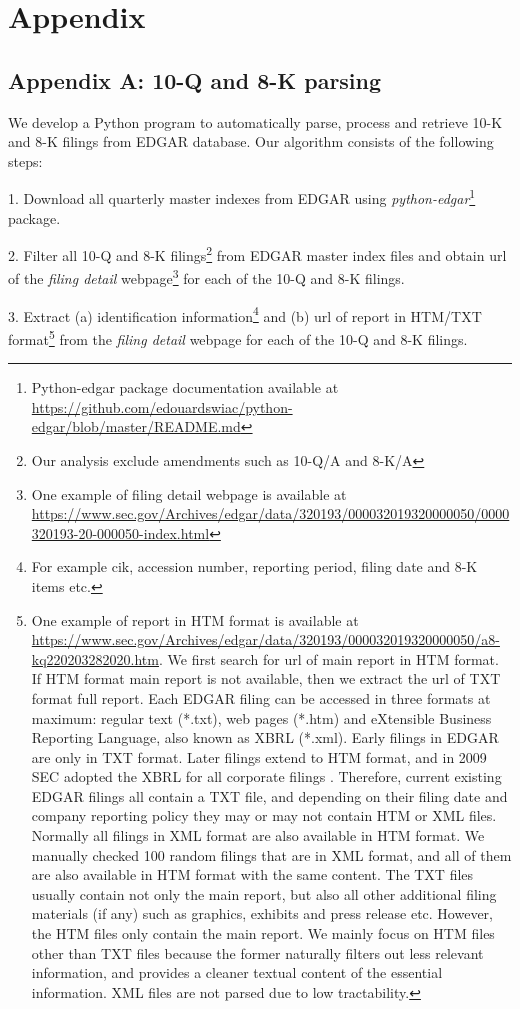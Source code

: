 \section*{Appendix}
\subsection*{Appendix A: 10-Q and 8-K parsing}
\label{appa}
We develop a Python program to automatically parse, process and retrieve 10-K and 8-K filings from EDGAR database. Our algorithm consists of the following steps:

1. Download all quarterly master indexes from EDGAR using \textit{python-edgar}\footnote{Python-edgar package documentation available at \url{https://github.com/edouardswiac/python-edgar/blob/master/README.md}} package.

2. Filter all 10-Q and 8-K filings\footnote{Our analysis exclude amendments such as 10-Q/A and 8-K/A} from EDGAR master index files and obtain url of the \textit{filing detail} webpage\footnote{One example of filing detail webpage is available at \url{https://www.sec.gov/Archives/edgar/data/320193/000032019320000050/0000320193-20-000050-index.html}} for each of the 10-Q and 8-K filings. 

3. Extract (a) identification information\footnote{For example cik, accession number, reporting period, filing date and 8-K items etc.} and (b) url of report in HTM/TXT format\footnote{One example of report in HTM format is available at \url{https://www.sec.gov/Archives/edgar/data/320193/000032019320000050/a8-kq220203282020.htm}. We first search for url of main report in HTM format. If HTM format main report is not available, then we extract the url of TXT format full report. Each EDGAR filing can be accessed in three formats at maximum: regular text (*.txt), web pages (*.htm) and eXtensible Business Reporting Language, also known as XBRL (*.xml). Early filings in EDGAR are only in TXT format. Later filings extend to HTM format, and in 2009 SEC adopted the XBRL for all corporate filings \cite{secFinalRuleInteractive2009}. Therefore, current existing EDGAR filings all contain a TXT file, and depending on their filing date and company reporting policy they may or may not contain HTM or XML files. Normally all filings in XML format are also available in HTM format. We manually checked 100 random filings that are in XML format, and all of them are also available in HTM format with the same content. The TXT files usually contain not only the main report, but also all other additional filing materials (if any) such as graphics, exhibits and press release etc. However, the HTM files only contain the main report. We mainly focus on HTM files other than TXT files because the former naturally filters out less relevant information, and provides a cleaner textual content of the essential information. XML files are not parsed due to low tractability. } from the \textit{filing detail} webpage for each of the 10-Q and 8-K filings. 

